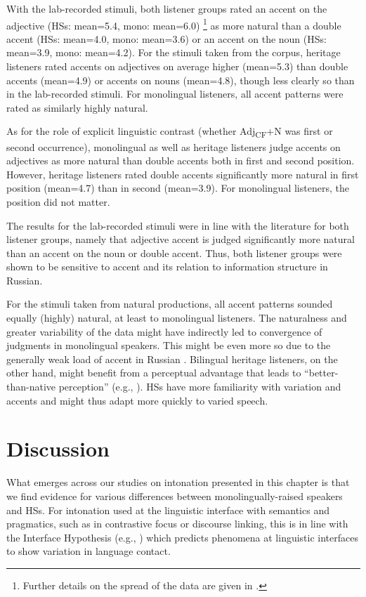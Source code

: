 \documentclass[output=paper,colorlinks,citecolor=brown]{langscibook}
\begin{document}
With the lab-recorded stimuli, both listener groups rated an accent on the adjective (HSs: mean=5.4, mono: mean=6.0) \footnote{Further details on the spread of the data are given in \citet{Zerbian_Barabashova_2023}.} as more natural than a double accent (HSs: mean=4.0, mono: mean=3.6) or an accent on the noun (HSs: mean=3.9, mono: mean=4.2). For the stimuli taken from the corpus, heritage listeners rated accents on adjectives on average higher (mean=5.3) than double accents (mean=4.9) or accents on nouns (mean=4.8), though less clearly so than in the lab-recorded stimuli. For monolingual listeners, all accent patterns were rated as similarly highly natural.

As for the role of explicit linguistic contrast (whether Adj\textsubscript{CF}+N was first or second occurrence), monolingual as well as heritage listeners judge accents on adjectives as more natural than double accents both in first and second position. However, heritage listeners rated double accents significantly more natural in first position (mean=4.7) than in second (mean=3.9). For monolingual listeners, the position did not matter.

The results for the lab-recorded stimuli were in line with the literature for both listener groups, namely that adjective accent is judged significantly more natural than an accent on the noun or double accent. Thus, both listener groups were shown to be sensitive to accent and its relation to information structure in Russian.

For the stimuli taken from natural productions, all accent patterns sounded equally (highly) natural, at least to monolingual listeners. The naturalness and greater variability of the data might have indirectly led to convergence of judgments in monolingual speakers. This might be even more so due to the generally weak load of accent in Russian \citep{Sekerina_Trueswell_2011}. Bilingual heritage listeners, on the other hand, might benefit from a perceptual advantage that leads to ``better-than-native perception'' (e.g., \cite{Chang_2016}). HSs have more familiarity with variation and accents and might thus adapt more quickly to varied speech.


\section{Discussion} \label{chapter12:section 6}

What emerges across our studies on intonation presented in this chapter is that we find evidence for various differences between monolingually-raised speakers and HSs. For intonation used at the linguistic interface with semantics and pragmatics, such as in contrastive focus or discourse linking, this is in line with the Interface Hypothesis (e.g., \cite{Sorace_2011}) which predicts phenomena at linguistic interfaces to show variation in language contact.
\end{document}
